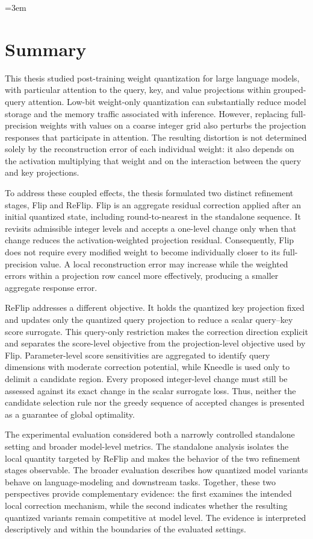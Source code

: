 \documentclass[../main.tex]{subfiles}
\begin{document}
\begingroup
\emergencystretch=3em

\section{Summary}

This thesis studied post-training weight quantization for large language models, with particular attention to the query, key, and value projections within grouped-query attention. Low-bit weight-only quantization can substantially reduce model storage and the memory traffic associated with inference. However, replacing full-precision weights with values on a coarse integer grid also perturbs the projection responses that participate in attention. The resulting distortion is not determined solely by the reconstruction error of each individual weight: it also depends on the activation multiplying that weight and on the interaction between the query and key projections.

To address these coupled effects, the thesis formulated two distinct refinement stages, Flip and ReFlip. Flip is an aggregate residual correction applied after an initial quantized state, including round-to-nearest in the standalone sequence. It revisits admissible integer levels and accepts a one-level change only when that change reduces the activation-weighted projection residual. Consequently, Flip does not require every modified weight to become individually closer to its full-precision value. A local reconstruction error may increase while the weighted errors within a projection row cancel more effectively, producing a smaller aggregate response error.

ReFlip addresses a different objective. It holds the quantized key projection fixed and updates only the quantized query projection to reduce a scalar query--key score surrogate. This query-only restriction makes the correction direction explicit and separates the score-level objective from the projection-level objective used by Flip. Parameter-level score sensitivities are aggregated to identify query dimensions with moderate correction potential, while Kneedle is used only to delimit a candidate region. Every proposed integer-level change must still be assessed against its exact change in the scalar surrogate loss. Thus, neither the candidate selection rule nor the greedy sequence of accepted changes is presented as a guarantee of global optimality.

The experimental evaluation considered both a narrowly controlled standalone setting and broader model-level metrics. The standalone analysis isolates the local quantity targeted by ReFlip and makes the behavior of the two refinement stages observable. The broader evaluation describes how quantized model variants behave on language-modeling and downstream tasks. Together, these two perspectives provide complementary evidence: the first examines the intended local correction mechanism, while the second indicates whether the resulting quantized variants remain competitive at model level. The evidence is interpreted descriptively and within the boundaries of the evaluated settings.
\end{document}
